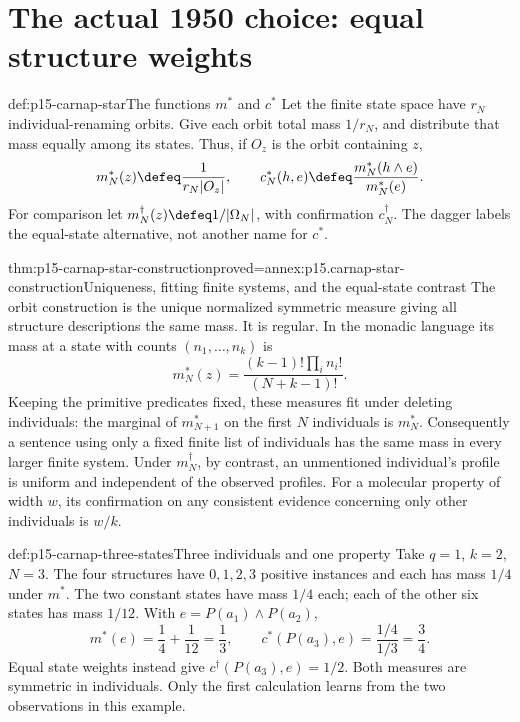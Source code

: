 \section{The actual 1950 choice: equal structure weights}
\label{sec:p15-carnap-star}

\begin{hbdefinition}{def:p15-carnap-star}{The functions \(m^*\) and \(c^*\)}
Let the finite state space have \(r_N\) individual-renaming orbits.
Give each orbit total mass \(1/r_N\), and distribute that mass equally
among its states. Thus, if \(O_z\) is the orbit containing \(z\),
\[
 m_N^*(z)\defeq\frac1{r_N|O_z|},\qquad
 c_N^*(h,e)\defeq\frac{m_N^*(h\land e)}{m_N^*(e)}.
\]
For comparison let \(m_N^\dagger(z)\defeq1/|\Omega_N|\), with
confirmation \(c_N^\dagger\). The dagger labels the equal-state
alternative, not another name for \(c^*\).
\end{hbdefinition}

\begin{hbtheorem}{thm:p15-carnap-star-construction}{proved=annex:p15.carnap-star-construction}{Uniqueness, fitting finite systems, and the equal-state contrast}
The orbit construction is the unique normalized symmetric measure giving
all structure descriptions the same mass. It is regular. In the monadic
language its mass at a state with counts \((n_1,\ldots,n_k)\) is
\[
 m_N^*(z)=\frac{(k-1)!\prod_i n_i!}{(N+k-1)!}.
\]
Keeping the primitive predicates fixed, these measures fit under deleting
individuals: the marginal of \(m_{N+1}^*\) on the first \(N\)
individuals is \(m_N^*\). Consequently a sentence using only a fixed
finite list of individuals has the same mass in every larger finite
system. Under \(m_N^\dagger\), by contrast, an unmentioned
individual's profile is uniform and independent of the observed profiles.
For a molecular property of width \(w\), its confirmation on any
consistent evidence concerning only other individuals is \(w/k\).
\end{hbtheorem}

\begin{hbexample}{def:p15-carnap-three-states}{Three individuals and one property}
Take \(q=1\), \(k=2\), \(N=3\). The four structures have
\(0,1,2,3\) positive instances and each has mass \(1/4\) under
\(m^*\). The two constant states have mass \(1/4\) each; each of
the other six states has mass \(1/12\). With
\(e=P(a_1)\land P(a_2)\),
\[
 m^*(e)=\frac14+\frac1{12}=\frac13,\qquad
 c^*(P(a_3),e)=\frac{1/4}{1/3}=\frac34.
\]
Equal state weights instead give \(c^\dagger(P(a_3),e)=1/2\).
Both measures are symmetric in individuals. Only the first calculation
learns from the two observations in this example.
\end{hbexample}


